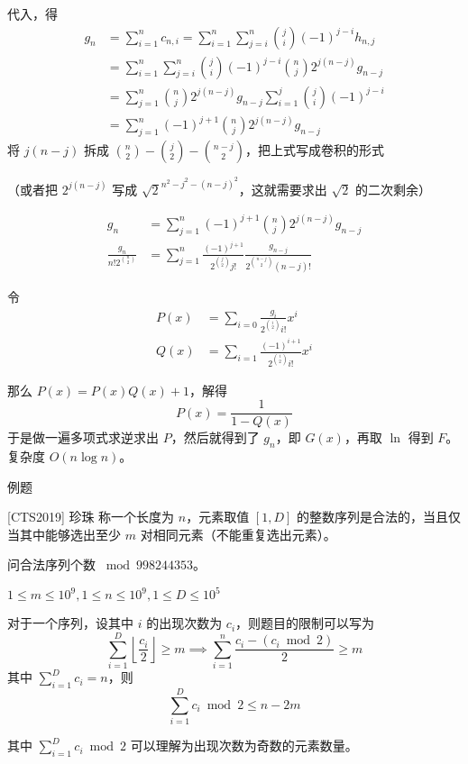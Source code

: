 \documentclass[UTF8]{beamer}
\begin{document}
    \begin{frame}
        代入，得
        $$
        \begin{aligned}
        g_n&=\sum_{i=1}^nc_{n,i}=\sum_{i=1}^n\sum_{j=i}^n\binom{j}{i}(-1)^{j-i}h_{n,j}\\
        &=\sum_{i=1}^n\sum_{j=i}^n\binom{j}{i}(-1)^{j-i}\binom{n}{j}2^{j(n-j)}g_{n-j}\\
        &=\sum_{j=1}^n\binom{n}{j}2^{j(n-j)}g_{n-j}\sum_{i=1}^j\binom{j}{i}(-1)^{j-i}\\
        &=\sum_{j=1}^n(-1)^{j+1}\binom{n}{j}2^{j(n-j)}g_{n-j}
        \end{aligned}
        $$
        \pause
        将 $j(n-j)$ 拆成 $\binom{n}{2}-\binom{j}{2}-\binom{n-j}{2}$，把上式写成卷积的形式

        （或者把 $2^{j(n-j)}$ 写成 $\sqrt{2}^{n^2-j^2-(n-j)^2}$，这就需要求出 $\sqrt 2$ 的二次剩余）
    \end{frame}

    \begin{frame}
        $$
        \begin{aligned}
        g_n&=\sum_{j=1}^n(-1)^{j+1}\binom{n}{j}2^{j(n-j)}g_{n-j}\\
        \frac{g_n}{n!2^{\binom{n}{2}}}&=\sum_{j=1}^n\frac{(-1)^{j+1}}{2^{\binom j2}j!}\frac{g_{n-j}}{2^{\binom {n-j}2}(n-j)!}
        \end{aligned}
        $$

        令
        $$
        \begin{aligned}
        P(x)&=\sum_{i=0}\frac{g_i}{2^{\binom{i}{2}}i!}x^i\\
        Q(x)&=\sum_{i=1}\frac{(-1)^{i+1}}{2^{\binom i2}i!}x^i
        \end{aligned}
        $$

        那么 $P(x)=P(x)Q(x)+1$，解得
        $$
        P(x)=\frac{1}{1-Q(x)}
        $$
        于是做一遍多项式求逆求出 $P$，然后就得到了 $g_n$，即 $G(x)$，再取 $\ln$ 得到 $F$。复杂度 $O(n\log n)$。
    \end{frame}

    \begin{frame}{例题}
        \begin{block}{[CTS2019] 珍珠}
            称一个长度为 $n$，元素取值 $[1,D]$ 的整数序列是合法的，当且仅当其中能够选出至少 $m$ 对相同元素（不能重复选出元素）。

            问合法序列个数 $\bmod 998244353$。

            $1\le m\le 10^9,1\le n\le 10^9,1\le D\le 10^5$
        \end{block}
        
        \pause

        对于一个序列，设其中 $i$ 的出现次数为 $c_i$，则题目的限制可以写为
        $$
        \sum_{i=1}^D\left\lfloor\frac{c_i}{2}\right\rfloor\ge m\implies \sum_{i=1}^n\frac{c_i-(c_i\bmod 2)}{2}\ge m
        $$
        其中 $\sum_{i=1}^D c_i=n$，则
        $$
        \sum_{i=1}^Dc_i\bmod 2\le n-2m
        $$

        其中 $\sum_{i=1}^Dc_i\bmod 2$ 可以理解为出现次数为奇数的元素数量。
    \end{frame}
\end{document}
